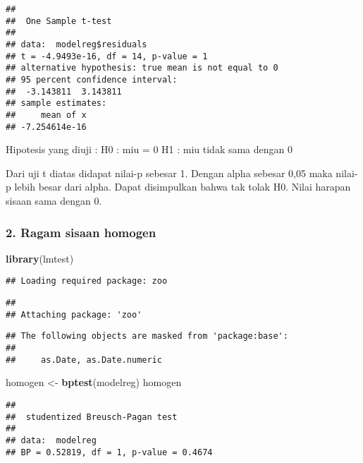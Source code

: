 \documentclass[
]{article}
\newenvironment{Shaded}{\begin{snugshade}}{\end{snugshade}}
\newcommand{\FunctionTok}[1]{\textcolor[rgb]{0.13,0.29,0.53}{\textbf{#1}}}
\newcommand{\NormalTok}[1]{#1}
\newcommand{\OtherTok}[1]{\textcolor[rgb]{0.56,0.35,0.01}{#1}}
\begin{document}
\begin{verbatim}
## 
##  One Sample t-test
## 
## data:  modelreg$residuals
## t = -4.9493e-16, df = 14, p-value = 1
## alternative hypothesis: true mean is not equal to 0
## 95 percent confidence interval:
##  -3.143811  3.143811
## sample estimates:
##     mean of x 
## -7.254614e-16
\end{verbatim}

Hipotesis yang diuji : H0 : miu = 0 H1 : miu tidak sama dengan 0

Dari uji t diatas didapat nilai-p sebesar 1. Dengan alpha sebesar 0,05
maka nilai-p lebih besar dari alpha. Dapat disimpulkan bahwa tak tolak
H0. Nilai harapan sisaan sama dengan 0.

\hypertarget{ragam-sisaan-homogen}{%
\subsubsection{2. Ragam sisaan homogen}\label{ragam-sisaan-homogen}}

\begin{Shaded}
\begin{Highlighting}[]
\FunctionTok{library}\NormalTok{(lmtest)}
\end{Highlighting}
\end{Shaded}

\begin{verbatim}
## Loading required package: zoo
\end{verbatim}

\begin{verbatim}
## 
## Attaching package: 'zoo'
\end{verbatim}

\begin{verbatim}
## The following objects are masked from 'package:base':
## 
##     as.Date, as.Date.numeric
\end{verbatim}

\begin{Shaded}
\begin{Highlighting}[]
\NormalTok{homogen }\OtherTok{\textless{}{-}} \FunctionTok{bptest}\NormalTok{(modelreg)}
\NormalTok{homogen}
\end{Highlighting}
\end{Shaded}

\begin{verbatim}
## 
##  studentized Breusch-Pagan test
## 
## data:  modelreg
## BP = 0.52819, df = 1, p-value = 0.4674
\end{verbatim}
\end{document}
